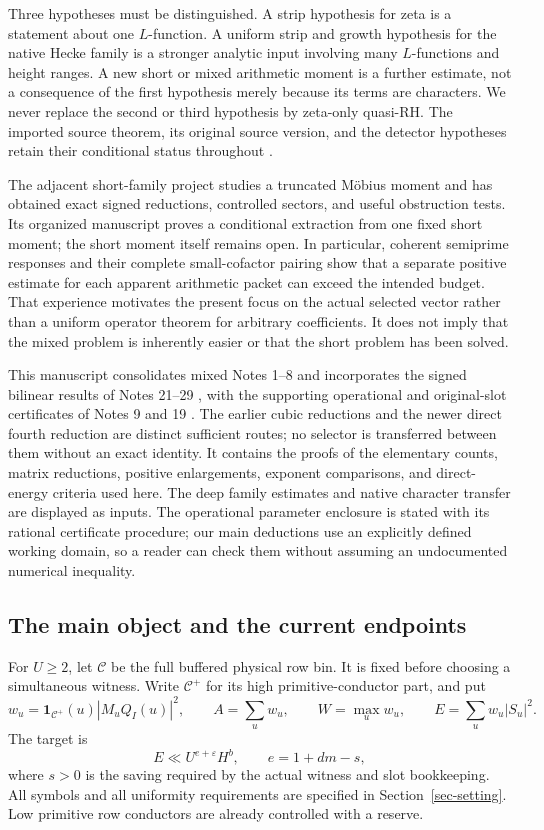 \documentclass[11pt]{article}
\theoremstyle{definition}
\newcommand{\eps}{\varepsilon}
\newcommand{\Id}{\mathbf 1}
\newcommand{\Cplus}{\mathcal C^+}
\begin{document}
Three hypotheses must be distinguished. A strip hypothesis for zeta is a statement about one $L$-function. A uniform strip and growth hypothesis for the native Hecke family is a stronger analytic input involving many $L$-functions and height ranges. A new short or mixed arithmetic moment is a further estimate, not a consequence of the first hypothesis merely because its terms are characters. We never replace the second or third hypothesis by zeta-only quasi-RH. The imported source theorem, its original source version, and the detector hypotheses retain their conditional status throughout \cite{amplification,continuation}.

The adjacent short-family project studies a truncated M\"obius moment and has obtained exact signed reductions, controlled sectors, and useful obstruction tests. Its organized manuscript \cite{sf} proves a conditional extraction from one fixed short moment; the short moment itself remains open. In particular, coherent semiprime responses and their complete small-cofactor pairing show that a separate positive estimate for each apparent arithmetic packet can exceed the intended budget. That experience motivates the present focus on the actual selected vector rather than a uniform operator theorem for arbitrary coefficients. It does not imply that the mixed problem is inherently easier or that the short problem has been solved.

This manuscript consolidates mixed Notes 1--8 \cite{n1,n2,n3,n4,n5,n6,n7,n8} and incorporates the signed bilinear results of Notes 21--29 \cite{n21,n22,n23,n24,n25,n26,n27,n28,n29}, with the supporting operational and original-slot certificates of Notes 9 and 19 \cite{n9,n19}. The earlier cubic reductions and the newer direct fourth reduction are distinct sufficient routes; no selector is transferred between them without an exact identity. It contains the proofs of the elementary counts, matrix reductions, positive enlargements, exponent comparisons, and direct-energy criteria used here. The deep family estimates and native character transfer are displayed as inputs. The operational parameter enclosure is stated with its rational certificate procedure; our main deductions use an explicitly defined working domain, so a reader can check them without assuming an undocumented numerical inequality.

\subsection{The main object and the current endpoints}
For $U\ge2$, let $\mathcal C$ be the full buffered physical row bin. It is fixed before choosing a simultaneous witness. Write $\Cplus$ for its high primitive-conductor part, and put
\[
 w_u=\Id_{\Cplus}(u)|M_uQ_I(u)|^2,\qquad
 A=\sum_u w_u,\qquad W=\max_u w_u,
 \qquad E=\sum_u w_u|S_u|^2.
\]
The target is
\begin{equation}\label{eq-energy-target}
 E\ll U^{e+\eps}H^b,\qquad e=1+dm-s,
\end{equation}
where $s>0$ is the saving required by the actual witness and slot bookkeeping. All symbols and all uniformity requirements are specified in Section~\ref{sec-setting}. Low primitive row conductors are already controlled with a reserve.
\end{document}
